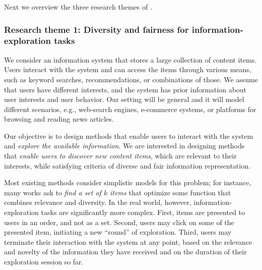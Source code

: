 \documentclass[a4paper,11pt]{article}
\begin{document}
\iffalse
With respect to methods, 
emphasis will be given to combinatorial algorithms,
building on the previous work of the PI 
on developing combinatorial methods for data-analysis problems.
In particular, we will consider techniques such as 
combinatorial optimization, 
optimization of submodular functions, 
local-search methods, 
greedy algorithms, 
dynamic pro\-gram\-ming, 
linear-pro\-gram\-ming and semi\-def\-ini\-te-pro\-gram\-ming relaxations, 
primal-dual methods, convex optimization,
stochastic gradient descent, etc. 
Furthermore, we will explore ideas in new domains, 
such as 
algorithms with predictions~\cite{mitzenmacher2022algorithms} and
reinforcement learning.
\fi

Next we overview the three research themes of \acronym.
\vspace{-3mm}

\subsubsection*{Research theme 1: Diversity and fairness for information-exploration tasks}
\vspace{-1mm}

\iffalse
\noindent
\hspace{-3mm}\colorbox{verylightmagenta}{
\begin{minipage}{\textwidth}
\ag{do we need a summary in a box?}
\end{minipage}}

\vspace{2mm}
\fi

We consider an information system
that stores a large collection of content items.
Users interact with the system and can access the items through various means, 
such as keyword searches, recommendations, or combinations of those.
We assume that users have different interests,
and the system has prior information about user interests and user behavior.
Our setting will be general and it will model different scenarios, 
e.g., web-search engines, e-commerce systems, 
or platforms for browsing and reading news articles.

Our objective is to design methods that enable users to 
interact with the system and 
\emph{explore the available information}.
We are interested in designing methods that \emph{enable users to discover new content items}, 
which are relevant to their interests, 
while satisfying criteria of diverse and fair information representation.

Most existing methods 
consider simplistic models for this problem;
for instance, many works ask to
\emph{find a set of $k$ items} 
that optimize some function that combines relevance and diversity. 
In the real world, however, information-exploration tasks are significantly more complex. 
First, items are presented to users in an order, and not as a set.
Second, users may click on some of the presented item, 
initiating a new ``round'' of exploration. 
Third, users may terminate their interaction with the system at any point,
based on the relevance and novelty of the information they have received
and on the duration of their exploration session so far.
\end{document}
